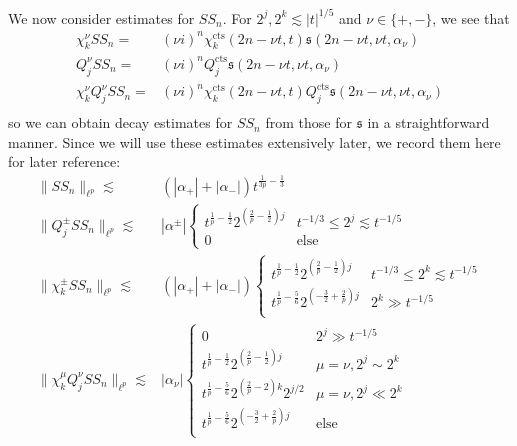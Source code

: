 \documentclass[letterpaper, reqno,final]{amsart}
\newcommand{\fs}{\mathfrak{s}}
\newcommand{\mSS}{\mathit{SS}}
\newcommand{\tcts}{\text{cts}}
\begin{document}
We now consider estimates for $\mSS_n$.  For $2^j, 2^k \lesssim |t|^{1/5}$ and $\nu \in \{+, -\}$, we see that
\begin{equation*}\begin{split}
    \chi_{k}^\nu \mSS_n =& (\nu i)^n \chi_k^\tcts(2n-\nu t,t) \fs(2n-\nu t, \nu t, \alpha_\nu)\\
    Q_{j}^\nu \mSS_n =& (\nu i)^n Q_j^\tcts\fs(2n-\nu t, \nu t, \alpha_\nu)\\
    \chi_{k}^\nu Q_{j}^\nu \mSS_n =& (\nu i)^n \chi_k^\tcts(2n-\nu t,t) Q_j^\tcts \fs(2n-\nu t, \nu t, \alpha_\nu)\\
\end{split}\end{equation*}
so we can obtain decay estimates for $\mSS_n$ from those for $\fs$ in a straightforward manner.  Since we will use these estimates extensively later, we record them here for later reference:
\begin{equation}\label{eqn:mssn-lin-ests}\begin{split}
    \lVert \mSS_n \rVert_{\ell^p} \lesssim& (|\alpha_{+}| + |\alpha_{-}|)  t^{\frac{1}{3p}-\frac{1}{3}}\\
    \lVert Q^{\pm}_j \mSS_n \rVert_{\ell^p} \lesssim& |\alpha^\pm|\begin{cases}
        t^{\frac{1}{p} - \frac{1}{2}} 2^{\left(\frac{2}{p}-\frac{1}{2}\right)j} & t^{-1/3} \leq 2^j \lesssim t^{-1/5}\\
        0 & \text{else}
    \end{cases}\\
    \lVert \chi_{k}^{\pm} \mSS_n \rVert_{\ell^p} \lesssim& (|\alpha_{+}| + |\alpha_{-}|)\begin{cases}
        t^{\frac{1}{p} - \frac{1}{2}} 2^{\left(\frac{2}{p}-\frac{1}{2}\right)j} & t^{-1/3} \leq 2^k \lesssim t^{-1/5}\\
        t^{\frac{1}{p} - \frac{5}{6}} 2^{\left(-\frac{3}{2} + \frac{2}{p}\right)j} & 2^k \gg t^{-1/5}\\
    \end{cases}\\
    \lVert \chi_{k}^\mu Q_j^\nu \mSS_n \rVert_{\ell^p} \lesssim& |\alpha_{\nu}| \begin{cases}
        0 & 2^j \gg t^{-1/5}\\
        t^{\frac{1}{p} - \frac{1}{2}} 2^{\left(\frac{2}{p}-\frac{1}{2}\right)j} & \mu = \nu, 2^j \sim 2^k\\
        t^{\frac{1}{p} - \frac{5}{6}} 2^{\left(\frac{2}{p} - 2\right)k} 2^{j/2} & \mu = \nu, 2^j \ll 2^k\\
        t^{\frac{1}{p} - \frac{5}{6}} 2^{\left(-\frac{3}{2} + \frac{2}{p}\right)j} & \text{else}\\
    \end{cases}
\end{split}\end{equation}	
\end{document}
